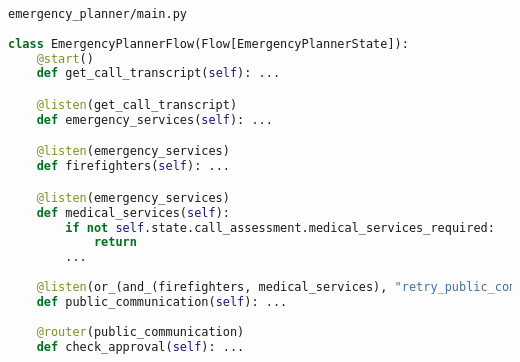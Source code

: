 \begin{frame}[fragile]{\texttt{emergency\_planner/main.py}}
    \begin{lstlisting}[language=Python]
class EmergencyPlannerFlow(Flow[EmergencyPlannerState]):
    @start()
    def get_call_transcript(self): ...

    @listen(get_call_transcript)
    def emergency_services(self): ...

    @listen(emergency_services)
    def firefighters(self): ...

    @listen(emergency_services)
    def medical_services(self):
        if not self.state.call_assessment.medical_services_required:
            return
        ...
    
    @listen(or_(and_(firefighters, medical_services), "retry_public_communication"))
    def public_communication(self): ...
    
    @router(public_communication)
    def check_approval(self): ...
\end{lstlisting}
\end{frame}